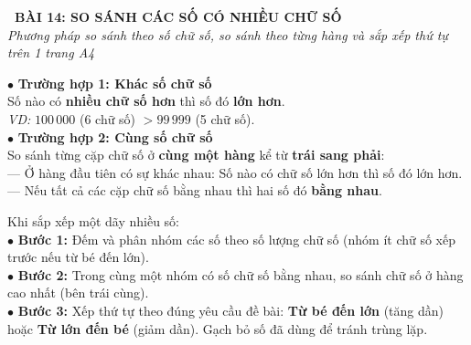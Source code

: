 \documentclass[14pt,a4paper,oneside]{extbook}
\begin{document}
\noindent
\begin{tcolorbox}[
  enhanced,
  colback=teal!8!white,
  colframe=teal!80!black,
  arc=3mm, boxrule=1pt,
  left=3mm, right=3mm, top=2mm, bottom=2mm,
  halign=center
]
  {\Large\bfseries\color{teal!90!black}\faBookmark\ BÀI 14: SO SÁNH CÁC SỐ CÓ NHIỀU CHỮ SỐ}\\[1.5pt]
  {\footnotesize\itshape\color{black!75} Phương pháp so sánh theo số chữ số, so sánh theo từng hàng và sắp xếp thứ tự trên 1 trang A4}
\end{tcolorbox}

\vspace{2mm}

\noindent
\begin{minipage}[t]{0.49\textwidth}
  \begin{tcolorbox}[
    enhanced,
    title={\footnotesize\bfseries\color{white}\faSortAmountDesc\ 1. Quy tắc so sánh 2 số},
    colback=blue!2!white,
    colframe=blue!75!black,
    arc=2.5mm, boxrule=0.8pt, top=1.8mm, bottom=1.8mm, left=2mm, right=2mm
  ]
    \footnotesize
    $\bullet$ \textbf{Trường hợp 1: Khác số chữ số}\\
    Số nào có \textbf{nhiều chữ số hơn} thì số đó \textbf{lớn hơn}.\\
    \textit{VD:} $100\,000$ (6 chữ số) $> 99\,999$ (5 chữ số).\\[1mm]
    $\bullet$ \textbf{Trường hợp 2: Cùng số chữ số}\\
    So sánh từng cặp chữ số ở \textbf{cùng một hàng} kể từ \textbf{trái sang phải}:\\
    --- Ở hàng đầu tiên có sự khác nhau: Số nào có chữ số lớn hơn thì số đó lớn hơn.\\
    --- Nếu tất cả các cặp chữ số bằng nhau thì hai số đó \textbf{bằng nhau}.
  \end{tcolorbox}
\end{minipage}%
\hfill
\begin{minipage}[t]{0.49\textwidth}
  \begin{tcolorbox}[
    enhanced,
    title={\footnotesize\bfseries\color{white}\faTasks\ 2. Kĩ năng sắp xếp thứ tự số},
    colback=teal!2!white,
    colframe=teal!75!black,
    arc=2.5mm, boxrule=0.8pt, top=1.8mm, bottom=1.8mm, left=2mm, right=2mm
  ]
    \footnotesize
    Khi sắp xếp một dãy nhiều số:\\
    $\bullet$ \textbf{Bước 1:} Đếm và phân nhóm các số theo số lượng chữ số (nhóm ít chữ số xếp trước nếu từ bé đến lớn).\\
    $\bullet$ \textbf{Bước 2:} Trong cùng một nhóm có số chữ số bằng nhau, so sánh chữ số ở hàng cao nhất (bên trái cùng).\\
    $\bullet$ \textbf{Bước 3:} Xếp thứ tự theo đúng yêu cầu đề bài: \textbf{Từ bé đến lớn} (tăng dần) hoặc \textbf{Từ lớn đến bé} (giảm dần). Gạch bỏ số đã dùng để tránh trùng lặp.
  \end{tcolorbox}
\end{minipage}
\end{document}
